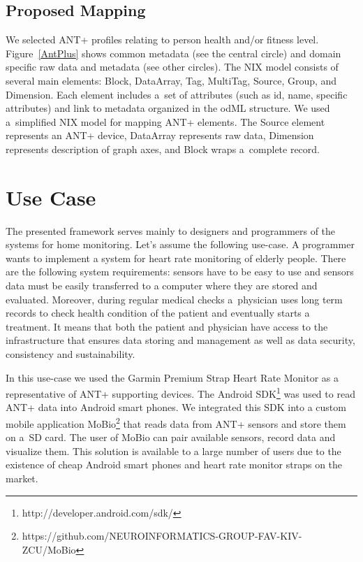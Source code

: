 \documentclass[a4paper,twoside]{article}
\begin{document}
\subsection{Proposed Mapping}

We selected ANT+ profiles relating to person health and/or fitness level. Figure~\ref{AntPlus} shows common metadata (see the central circle) and domain specific raw data and metadata (see other circles). The NIX model consists of several main elements: Block, DataArray, Tag, MultiTag, Source, Group, and Dimension. Each element includes a~set of attributes (such as id, name, specific attributes) and link to metadata organized in the odML structure. We used a~simplified NIX model for mapping ANT+ elements. The Source element represents an ANT+ device, DataArray represents raw data, Dimension represents description of graph axes, and Block wraps a~complete record.


\section{Use Case}\label{sec:use-case}

The presented framework serves mainly to designers and programmers of the systems for home monitoring. Let's assume the following use-case. A programmer wants to implement a system for heart rate monitoring of elderly people. There are the following system requirements: sensors have to be easy to use and  sensors data must be easily transferred to a computer where they are stored and evaluated. Moreover, during regular medical checks a~physician uses long term records to check health condition of the patient and eventually starts a treatment. It means that both the patient and physician have access to the infrastructure that ensures data storing and management as well as data security, consistency and sustainability.

In this use-case we used the Garmin Premium Strap Heart Rate Monitor as a representative of ANT+ supporting devices. The Android SDK\footnote{http://developer.android.com/sdk/} was used to read ANT+ data into Android smart phones. We integrated this SDK into a custom mobile application MoBio\footnote{https://github.com/NEUROINFORMATICS-GROUP-FAV-KIV-ZCU/MoBio} that reads data from ANT+ sensors and store them on a~SD card. The user of MoBio can pair available sensors, record data and visualize them. This solution is available to a large number of users due to the existence of cheap Android smart phones and heart rate monitor straps on the market.
\end{document}
